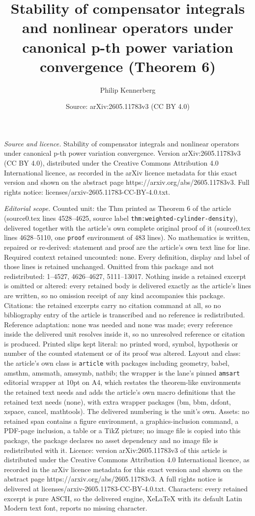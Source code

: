 \documentclass[10pt,a4paper]{amsart}
\title[Stability of compensator integrals and nonlinear operators u]{Stability of compensator integrals and nonlinear operators under canonical p-th power variation convergence (Theorem 6)}
\author{Philip Kennerberg}
\date{Source: arXiv:2605.11783v3 (CC BY 4.0)}
\begin{document}
\maketitle

\noindent\emph{Source and licence.} Stability of compensator integrals and nonlinear operators under canonical p-th power variation convergence. Version arXiv:2605.11783v3 (CC BY 4.0), distributed under the Creative Commons Attribution 4.0 International licence, as recorded in the arXiv licence metadata for this exact version and shown on the abstract page https://arxiv.org/abs/2605.11783v3. Full rights notice: licenses/arxiv-2605.11783-CC-BY-4.0.txt.\par\smallskip

\noindent\textit{Editorial scope.} Counted unit: the Thm printed as Theorem 6 of the article (source0.tex lines 4528--4625, source label \texttt{thm:weighted-cylinder-density}), delivered together with the article's own complete original proof of it (source0.tex lines 4628--5110, one \texttt{proof} environment of 483 lines). No mathematics is written, repaired or re-derived: statement and proof are the article's own text line for line. Required context retained uncounted: none. Every definition, display and label of those lines is retained unchanged. Omitted from this package and not redistributed: 1--4527, 4626--4627, 5111--13017. Nothing inside a retained excerpt is omitted or altered: every retained body is delivered exactly as the article's lines are written, so no omission receipt of any kind accompanies this package. Citations: the retained excerpts carry no citation command at all, so no bibliography entry of the article is transcribed and no reference is redistributed. Reference adaptation: none was needed and none was made; every reference inside the delivered unit resolves inside it, so no unresolved reference or citation is produced. Printed slips kept literal: no printed word, symbol, hypothesis or number of the counted statement or of its proof was altered. Layout and class: the article's own class is \texttt{article} with packages including geometry, babel, amsthm, amsmath, amssymb, natbib; the wrapper is the lane's pinned \texttt{amsart} editorial wrapper at 10pt on A4, which restates the theorem-like environments the retained text needs and adds the article's own macro definitions that the retained text needs (none), with extra wrapper packages (bm, bbm, dsfont, xspace, cancel, mathtools). The delivered numbering is the unit's own. Assets: no retained span contains a figure environment, a graphics-inclusion command, a PDF-page inclusion, a table or a TikZ picture; no image file is copied into this package, the package declares no asset dependency and no image file is redistributed with it. Licence: version arXiv:2605.11783v3 of this article is distributed under the Creative Commons Attribution 4.0 International licence, as recorded in the arXiv licence metadata for this exact version and shown on the abstract page https://arxiv.org/abs/2605.11783v3. A full rights notice is delivered at licenses/arxiv-2605.11783-CC-BY-4.0.txt. Characters: every retained excerpt is pure ASCII, so the delivered engine, XeLaTeX with its default Latin Modern text font, reports no missing character.
\end{document}

